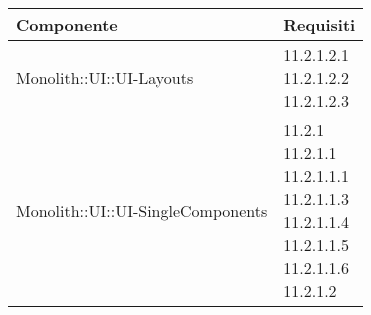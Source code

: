 \begin{center}
\begin{longtable}{|
*{1}{>{\centering\arraybackslash}p{7cm}|}
*{1}{>{\centering\arraybackslash}p{3cm}|}}
\hline \textbf{Componente} & \textbf{Requisiti}\\
\hline \endhead
\hline \endfoot

Monolith::UI::UI-Layouts & \makecell{11.2.1.2.1
\\11.2.1.2.2
\\11.2.1.2.3
\\}\\\hline
Monolith::UI::UI-SingleComponents & \makecell{11.2.1
\\11.2.1.1
\\11.2.1.1.1
\\11.2.1.1.3
\\11.2.1.1.4
\\11.2.1.1.5
\\11.2.1.1.6
\\11.2.1.2
\\}\\\hline
\end{longtable}
\end{center}
